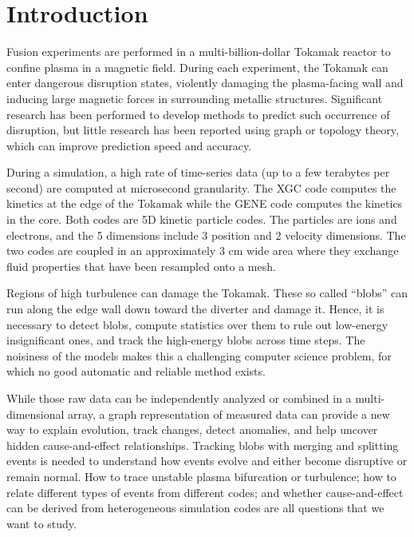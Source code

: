 \newcommand{\cA}{\mathcal{A}} %
\newcommand{\R}{\mathbb{R}} %
\newcommand{\cD}{\mathcal{D}} %
\newcommand{\cC}{\mathcal{C}} %
\newcommand{\Xs}{X^*} %
\newcommand{\cN}{\mathcal{N}} %


\section{Introduction}
\label{sec:intro}

Fusion experiments are performed in a multi-billion-dollar Tokamak reactor to confine plasma in a magnetic field. During each experiment, the Tokamak can enter dangerous disruption states, violently damaging the plasma-facing wall and inducing large magnetic forces in surrounding metallic structures. Significant research has been performed to develop methods to predict such occurrence of disruption, but little research has been reported using graph or topology theory, which can improve prediction speed and accuracy.

During a simulation, a high rate of time-series data (up to a few terabytes per second) are computed at microsecond granularity. The XGC code computes the kinetics at the edge of the Tokamak while the GENE code computes the kinetics in the core. Both codes are 5D kinetic particle codes. The particles are ions and electrons, and the 5 dimensions include 3 position and 2 velocity dimensions. The two codes are coupled in an approximately 3 cm wide area where they exchange fluid properties that have been resampled onto a mesh.

Regions of high turbulence can damage the Tokamak.  These so called ``blobs'' can run along the edge wall down toward the diverter and damage it.  Hence, it is necessary to detect blobs, compute statistics over them to rule out low-energy insignificant ones, and track the high-energy blobs across time steps. The noisiness of the models makes this a challenging computer science problem, for which no good automatic and reliable method exists.

While those raw data can be independently analyzed or combined in a multi-dimensional array, a graph representation of measured data can provide a new way to explain evolution, track changes, detect anomalies, and help uncover hidden cause-and-effect relationships. Tracking blobs with merging and splitting events is needed to understand how events evolve and either become disruptive or remain normal.  How to trace unstable plasma bifurcation or turbulence; how to relate different types of events from different codes; and whether cause-and-effect can be derived from heterogeneous simulation codes are all questions that we want to study.


